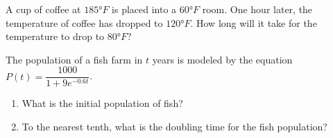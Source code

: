 \newpage

\begin{exercise}
  A cup of coffee at $185\unit{\degree F}$ is placed into a $60\unit{\degree F}$ room. One hour later, the temperature of coffee has dropped to $120\unit{\degree F}$. How long will it take for the temperature to drop to $80\unit{\degree F}$?
\end{exercise}

\begin{exercise}
  The population of a fish farm in $t$ years is modeled by the equation $P(t)=\dfrac{1000}{1+9e^{-0.6t}}$.
\begin{enumerate}
  \item What is the initial population of fish?
  \item To the nearest tenth, what is the doubling time for the fish population?
\end{enumerate}
\end{exercise}

